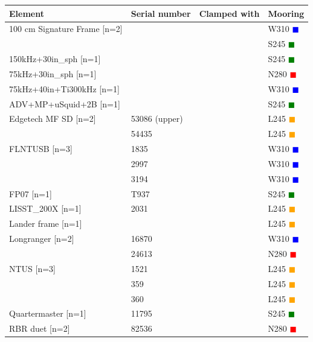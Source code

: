 \documentclass{article}
\begin{document}
\begin{tabularx}{\linewidth}{|X|l|l|X|}
\caption{All: summary of instruments}\\
\hline
\textbf{Element} & \textbf{Serial number} & \textbf{Clamped with} & \textbf{Mooring} \\
\hline
100 cm Signature Frame [n=2] &  &  & W310 \textcolor{blue}{$\blacksquare$} \\ \hline
 &  &  & S245 \textcolor{green}{$\blacksquare$} \\ \hline
150kHz+30in\_sph [n=1] &  &  & S245 \textcolor{green}{$\blacksquare$} \\ \hline
75kHz+30in\_sph [n=1] &  &  & N280 \textcolor{red}{$\blacksquare$} \\ \hline
75kHz+40in+Ti300kHz [n=1] &  &  & W310 \textcolor{blue}{$\blacksquare$} \\ \hline
ADV+MP+uSquid+2B [n=1] &  &  & S245 \textcolor{green}{$\blacksquare$} \\ \hline
Edgetech MF SD [n=2] & 53086 (upper) &  & L245 \textcolor{orange}{$\blacksquare$} \\ \hline
 & 54435 &  & L245 \textcolor{orange}{$\blacksquare$} \\ \hline
FLNTUSB [n=3] & 1835 &  & W310 \textcolor{blue}{$\blacksquare$} \\ \hline
 & 2997 &  & W310 \textcolor{blue}{$\blacksquare$} \\ \hline
 & 3194 &  & W310 \textcolor{blue}{$\blacksquare$} \\ \hline
FP07 [n=1] & T937 &  & S245 \textcolor{green}{$\blacksquare$} \\ \hline
LISST\_200X [n=1] & 2031 &  & L245 \textcolor{orange}{$\blacksquare$} \\ \hline
Lander frame [n=1] &  &  & L245 \textcolor{orange}{$\blacksquare$} \\ \hline
Longranger [n=2] & 16870 &  & W310 \textcolor{blue}{$\blacksquare$} \\ \hline
 & 24613 &  & N280 \textcolor{red}{$\blacksquare$} \\ \hline
NTUS [n=3] & 1521 &  & L245 \textcolor{orange}{$\blacksquare$} \\ \hline
 & 359 &  & L245 \textcolor{orange}{$\blacksquare$} \\ \hline
 & 360 &  & L245 \textcolor{orange}{$\blacksquare$} \\ \hline
Quartermaster [n=1] & 11795 &  & S245 \textcolor{green}{$\blacksquare$} \\ \hline
RBR duet [n=2] & 82536 &  & N280 \textcolor{red}{$\blacksquare$} \\ \hline

\end{tabularx}
\end{document}
